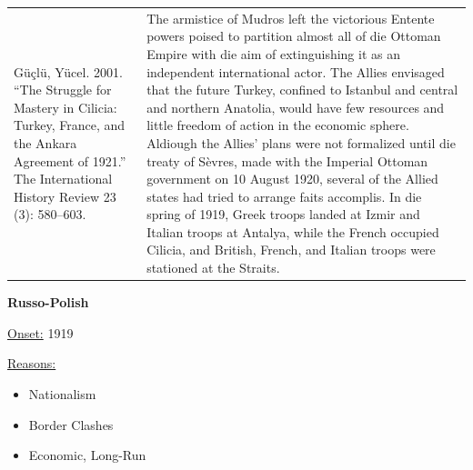 {\begin{longtable}{p{}p{}}
\\
Güçlü, Yücel. 2001. “The Struggle for Mastery in Cilicia: Turkey, France, and the Ankara Agreement of 1921.” The International History Review 23 (3): 580–603.
 & The armistice of Mudros left the victorious Entente powers poised to partition almost all of die Ottoman Empire with die aim of extinguishing it as an independent international actor. The Allies envisaged that the future Turkey, confined to Istanbul and central and northern Anatolia, would have few resources and little freedom of action in the economic sphere. Aldiough the Allies' plans were not formalized until die treaty of Sèvres, made with the Imperial Ottoman government on 10 August 1920, several of the Allied states had tried to arrange faits accomplis. In die spring of 1919, Greek troops landed at Izmir and Italian troops at Antalya, while the French occupied Cilicia, and British, French, and Italian troops were stationed at the Straits.
\\
\end{longtable}}
\clearpage
         \textbf{Russo-Polish} 

          \underline{Onset:} 1919         

\underline{Reasons:}
\begin{itemize}
\item Nationalism
\item Border Clashes
\item Economic, Long-Run
\end{itemize}

